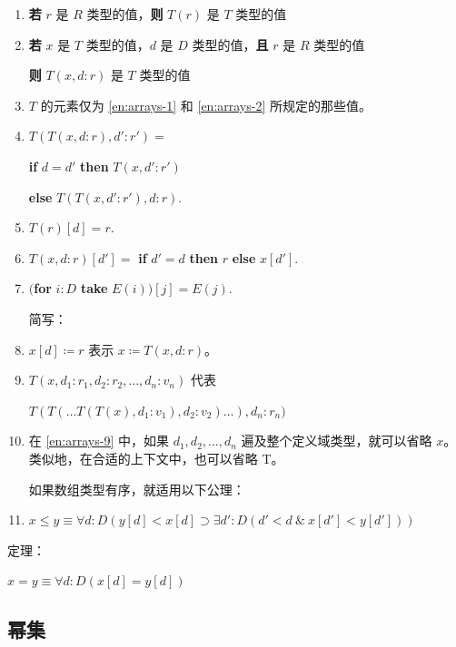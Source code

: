 \documentclass[twoside,11pt,fontset=none]{ctexbook}
\begin{document}
\begin{enumerate}[wide, nosep, label=(\arabic*)]
	\item \label{en:arrays-1}
	\textbf{若} $r$ 是 $R$ 类型的值，\textbf{则} $T(r)$ 是 $T$ 类型的值

	\item \label{en:arrays-2}
	\textbf{若} $x$ 是 $T$ 类型的值，$d$ 是 $D$ 类型的值，\textbf{且} $r$ 是 $R$ 类型的值

	\qquad\quad \textbf{则} $T(x, d:r)$ 是 $T$ 类型的值

	\item $T$ 的元素仅为 \ref{en:arrays-1} 和 \ref{en:arrays-2} 所规定的那些值。

	\item $T(T(x, d:r), d':r') =$

	\quad \textbf{if} $d = d'$ \textbf{then} $T(x, d':r')$

	\qquad\quad\textbf{else} $T(T(x, d':r'), d:r).$

	\item $T(r)[d] = r.$

	\item $T(x, d:r)[d'] =$ \textbf{if} $d' = d$ \textbf{then} $r$ \textbf{else} $x[d'].$

	\item $($\textbf{for} $i:D$ \textbf{take} $E(i))[j] = E(j).$

	\noindent
	简写：

	\item $x[d] \coloneq r$ 表示 $x \coloneq T(x, d:r)$。

	\item\label{en:arrays-9}
	 $T(x, d_1:r_1, d_2 : r_2, \dots, d_n:v_n)$ 代表

	\quad $T(T(\dots T(T(x), d_1:v_1), d_2:v_2)\dots), d_n:r_n)$

	\item 在 \ref{en:arrays-9} 中，如果 $d_1, d_2, \dots, d_n$ 遍及整个定义域类型，就可以省略 $x$。类似地，在合适的上下文中，也可以省略 T。

如果数组类型有序，就适用以下公理：

	\item $x \leqslant y \equiv \forall d: D(y[d] < x[d] \supset \exists d':D(d' < d\ \&\ x[d'] < y[d']))$
\end{enumerate}

\noindent
定理：

$x = y \equiv \forall d:D(x[d] = y[d])$

\subsection{幂集}
\end{document}

